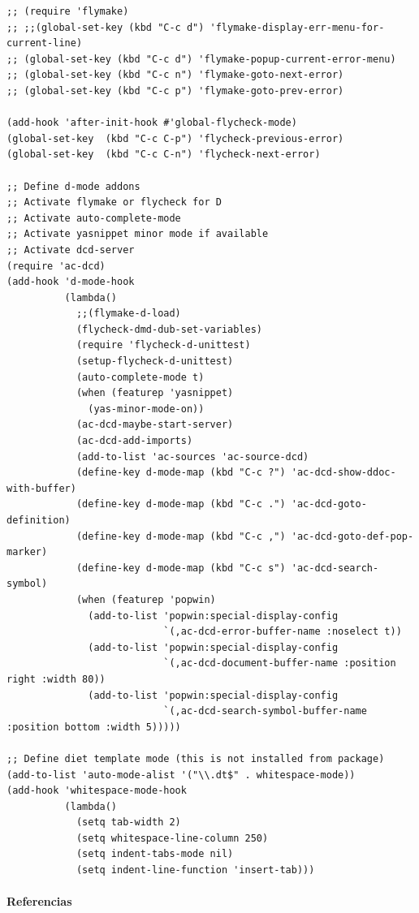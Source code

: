 \documentclass[12pt,spanish,]{scrartcl}
\let\oldparagraph\paragraph
\renewcommand{\paragraph}[1]{\oldparagraph{#1}\mbox{}}
\begin{document}
\begin{verbatim}
;; (require 'flymake)
;; ;;(global-set-key (kbd "C-c d") 'flymake-display-err-menu-for-current-line)
;; (global-set-key (kbd "C-c d") 'flymake-popup-current-error-menu)
;; (global-set-key (kbd "C-c n") 'flymake-goto-next-error)
;; (global-set-key (kbd "C-c p") 'flymake-goto-prev-error)

(add-hook 'after-init-hook #'global-flycheck-mode)
(global-set-key  (kbd "C-c C-p") 'flycheck-previous-error)
(global-set-key  (kbd "C-c C-n") 'flycheck-next-error)

;; Define d-mode addons
;; Activate flymake or flycheck for D
;; Activate auto-complete-mode
;; Activate yasnippet minor mode if available
;; Activate dcd-server
(require 'ac-dcd)
(add-hook 'd-mode-hook
          (lambda()
            ;;(flymake-d-load)
            (flycheck-dmd-dub-set-variables)
            (require 'flycheck-d-unittest)
            (setup-flycheck-d-unittest)
            (auto-complete-mode t)
            (when (featurep 'yasnippet)
              (yas-minor-mode-on))
            (ac-dcd-maybe-start-server)
            (ac-dcd-add-imports)
            (add-to-list 'ac-sources 'ac-source-dcd)
            (define-key d-mode-map (kbd "C-c ?") 'ac-dcd-show-ddoc-with-buffer)
            (define-key d-mode-map (kbd "C-c .") 'ac-dcd-goto-definition)
            (define-key d-mode-map (kbd "C-c ,") 'ac-dcd-goto-def-pop-marker)
            (define-key d-mode-map (kbd "C-c s") 'ac-dcd-search-symbol)
            (when (featurep 'popwin)
              (add-to-list 'popwin:special-display-config
                           `(,ac-dcd-error-buffer-name :noselect t))
              (add-to-list 'popwin:special-display-config
                           `(,ac-dcd-document-buffer-name :position right :width 80))
              (add-to-list 'popwin:special-display-config
                           `(,ac-dcd-search-symbol-buffer-name :position bottom :width 5)))))

;; Define diet template mode (this is not installed from package)
(add-to-list 'auto-mode-alist '("\\.dt$" . whitespace-mode))
(add-hook 'whitespace-mode-hook
          (lambda()
            (setq tab-width 2)
            (setq whitespace-line-column 250)
            (setq indent-tabs-mode nil)
            (setq indent-line-function 'insert-tab)))
\end{verbatim}

\paragraph{Referencias}\label{referencias}
\end{document}
